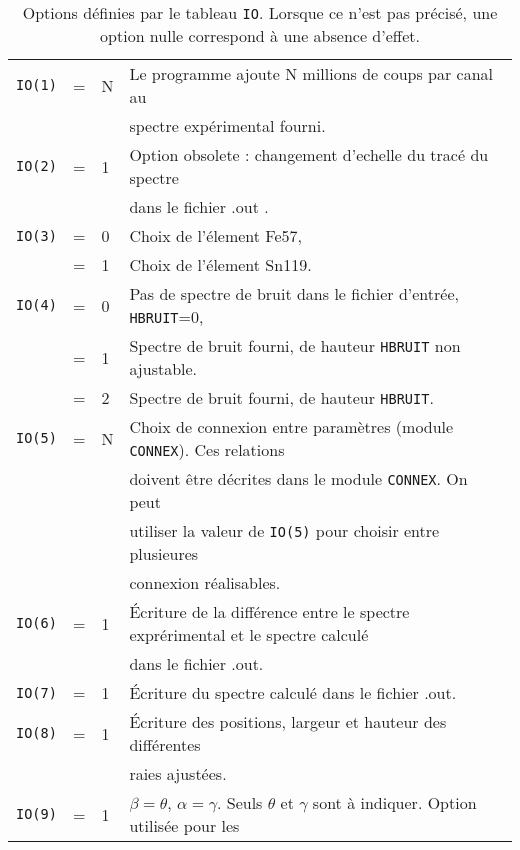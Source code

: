 \begin{table}
\caption{\label{tab:IO} Options définies par le tableau \lstinline{IO}. Lorsque ce n'est pas précisé, une option nulle correspond à une absence d'effet.}
\begin{tabular}{|rcl|l|}
\hline
\lstinline{IO(1)} &=& N & Le programme ajoute N millions de coups par canal au \\
                  & &    & spectre expérimental fourni.\\
\hline
\lstinline{IO(2)} &=& 1 & Option obsolete : changement d'echelle du tracé du spectre \\
                  & &   & dans le fichier .out .  \\
\hline
\lstinline{IO(3)} &=& 0 & Choix de l'élement Fe57,\\
                  &=& 1 & Choix de l'élement Sn119. \\
\hline
\lstinline{IO(4)} &=& 0 & Pas de spectre de bruit dans le fichier d'entrée, \lstinline{HBRUIT}=0, \\
                  &=& 1 & Spectre de bruit fourni, de hauteur \lstinline{HBRUIT} non ajustable. \\
                  &=& 2 & Spectre de bruit fourni, de hauteur \lstinline{HBRUIT}.\\
\hline  
\lstinline{IO(5)} &=& N & Choix de connexion entre paramètres (module \lstinline{CONNEX}). Ces relations\\
                  & &  & doivent être décrites dans le module \lstinline{CONNEX}. On peut \\
                  & &  & utiliser la valeur de \lstinline{IO(5)}  pour choisir entre plusieures \\
                  & &  & connexion réalisables.\\
\hline  
\lstinline{IO(6)} &=& 1 & \'Ecriture de la différence entre le spectre exprérimental et le spectre calculé\\
                  & &  & dans le fichier .out.\\
\hline  
\lstinline{IO(7)} &=& 1 & \'Ecriture du spectre calculé dans le fichier .out.\\
\hline
\lstinline{IO(8)} &=& 1 & \'Ecriture des positions, largeur et hauteur des différentes\\
                  & &   & raies ajustées. \\
\hline  
\lstinline{IO(9)} &=& 1 & $\beta=\theta$, $\alpha=\gamma$. Seuls $\theta$ et  $\gamma$ sont à indiquer. Option utilisée pour les \\

\end{tabular}
\end{table}

